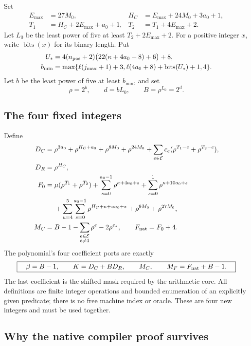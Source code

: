 Set
\begin{align*}
 E_{\max}&=27M_0,&
 H_C&=E_{\max}+24M_0+3a_0+1,\\
 T_1&=H_C+2E_{\max}+a_0+1,&
 T_2&=T_1+4E_{\max}+2.
\end{align*}
Let $L_0$ be the least power of five at least $T_2+2E_{\max}+2$.
For a positive integer $x$, write $\operatorname{bits}(x)$ for its binary
length.  Put
\begin{align*}
 U_*&=4(n_{\rm pos}+2)\bigl(22(\kappa+4a_0+8)+6\bigr)+8,\\
 b_{\min}&=\max\{\ell(j_{\max}+1)+3,
            \ell(4a_0+8)+\operatorname{bits}(U_*)+1,4\}.
\end{align*}
Let $b$ be the least power of five at least $b_{\min}$, and set
\[
 \rho=2^b,\qquad d=bL_0,\qquad B=\rho^{L_0}=2^d.
\]

\subsection{The four fixed integers}

Define
\begin{align*}
 D_C={}&\rho^{3a_0}+\rho^{H_C+a_0}
       +\rho^{8M_0}+\rho^{24M_0}
       +\sum_{e\in\mathcal E}c_e
          (\rho^{T_1-e}+\rho^{T_2-e}),\\
 D_R={}&\rho^{H_C},\\
 F_0={}&\mu(\rho^{T_1}+\rho^{T_2})
       +\sum_{s=0}^{a_0-1}\rho^{\kappa+4a_0+s}
       +\sum_{s=0}^{1}\rho^{\kappa+10a_0+s}\\
     &+\sum_{u=4}^{5}\sum_{s=0}^{a_0-1}
             \rho^{H_C+\kappa+ua_0+s}
       +\rho^{9M_0}+\rho^{27M_0},\\
 M_C={}&B-1-\sum_{\substack{e\in\mathcal E\\ e\ne1}}\rho^e
              -2\rho^{e_*},\qquad
 F_{\rm nat}=F_0+4.
\end{align*}
The polynomial's four coefficient ports are exactly
\begin{equation}
 \boxed{\quad\beta=B-1,\qquad K=D_C+BD_R,\qquad
 M_C,\qquad M_F=F_{\rm nat}+B-1.\quad}
 \label{eq:projected-ports}
\end{equation}
The last coefficient is the shifted mask required by the arithmetic core.
All definitions are finite integer operations and bounded enumeration of
an explicitly given predicate; there is no free machine index or oracle.
These are four new integers and must be used together.

\subsection{Why the native compiler proof survives}

